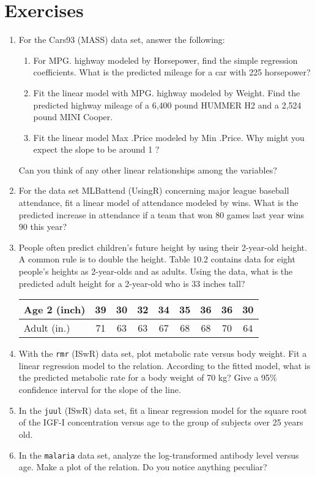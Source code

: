 \documentclass[11pt]{article}
\begin{document}
\section{Exercises}
\begin{enumerate}
\item  For the Cars93 (MASS) data set, answer the following:
  \begin{enumerate}
  \item For MPG. highway modeled by Horsepower, find the simple regression
    coefficients. What is the predicted mileage for a car with 225 horsepower?
  \item Fit the linear model with MPG. highway modeled by Weight. Find the predicted highway mileage of a 6,400 pound HUMMER H2 and a 2,524 pound MINI Cooper.
  \item Fit the linear model Max .Price modeled by Min .Price. Why might you expect the slope to be around 1 ?
  \end{enumerate}
  Can you think of any other linear relationships among the variables?
\item  For the data set MLBattend (UsingR) concerning major league baseball
  attendance, fit a linear model of attendance modeled by wins. What is the predicted increase in attendance if a team that won 80 games last year wins 90 this year?
\item  People often predict children’s future height by using their 2-year-old height. A common rule is to double the height. Table 10.2 contains data for eight people’s heights as 2-year-olds and as adults. Using the data, what is the predicted adult height for a 2-year-old who is 33 inches tall?

  \begin{tabular}{l c c c c c c c c}
    \hline
    Age 2 (inch) & 39 & 30 & 32 & 34 & 35 & 36 & 36 & 30 \\
    \hline
    Adult (in.) & 71 & 63 & 63 & 67 & 68 & 68 & 70 & 64 \\
    \hline
  \end{tabular}
\item With the \texttt{rmr} (ISwR) data set, plot metabolic rate versus body weight. Fit a linear regression model to the relation. According to the fitted model, what is the predicted metabolic rate for a body weight of 70 kg? Give a
  95\% confidence interval for the slope of the line.
\item In the \texttt{juul} (ISwR) data set, fit a linear regression model for the square root of the IGF-I concentration versus age to the group of subjects over 25 years old.
\item In the \texttt{malaria} data set, analyze the log-transformed antibody level
  versus age. Make a plot of the relation. Do you notice anything peculiar?
\end{enumerate}
\end{document}
